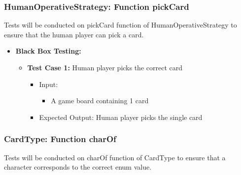 \documentclass[12pt]{article}
\begin{document}

\subsubsection{HumanOperativeStrategy: Function pickCard}
Tests will be conducted on pickCard function of HumanOperativeStrategy to ensure that the human player can pick a card.

\begin{itemize}
    \item \textbf{Black Box Testing:}
    \begin{itemize}
       \item \textbf{Test Case 1:} Human player picks the correct card
            \begin{itemize}
            \item Input:
                \begin{itemize}
                    \item A game board containing 1 card
                \end{itemize}
            \item Expected Output: Human player picks the single card
      \end{itemize}
    \end{itemize}
\end{itemize}




\subsubsection{CardType: Function charOf}
Tests will be conducted on charOf function of CardType to ensure that a character corresponds to the correct enum value.
\end{document}
